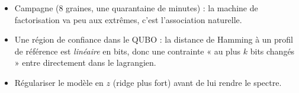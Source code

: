 \begin{pistes}
\begin{itemize}
\item Campagne  (8 graines, une quarantaine de minutes) : la machine de factorisation va peu aux extrêmes, c'est l'association naturelle.
\item Une région de confiance dans le QUBO : la distance de Hamming à un profil de référence est \emph{linéaire} en bits, donc une contrainte « au plus $k$ bits changés » entre directement dans le lagrangien.
\item Régulariser le modèle en $z$ (ridge plus fort) avant de lui rendre le spectre.
\end{itemize}
\end{pistes}

